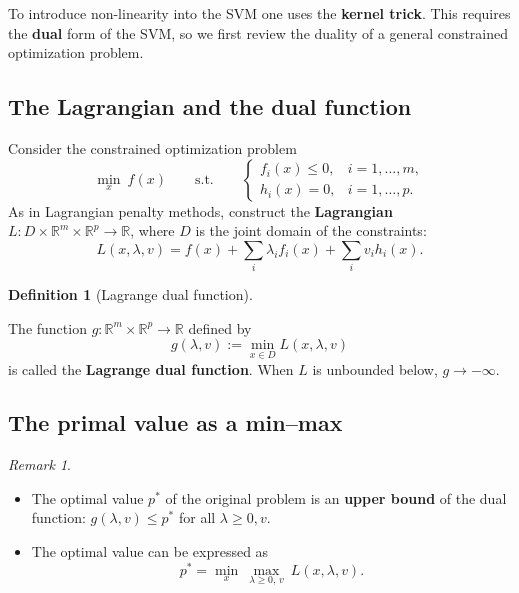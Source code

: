 \documentclass[
  letterpaper,
  DIV=11,
  numbers=noendperiod]{scrreprt}
\providecommand{\tightlist}{%
  \setlength{\itemsep}{0pt}\setlength{\parskip}{0pt}}
\theoremstyle{definition}
\newtheorem{definition}{Definition}[chapter]
\theoremstyle{plain}
\theoremstyle{plain}
\theoremstyle{definition}
\theoremstyle{plain}
\theoremstyle{plain}
\theoremstyle{remark}
\newtheorem*{remark}{Remark}
\begin{document}
To introduce non-linearity into the SVM one uses the \textbf{kernel
trick}. This requires the \textbf{dual} form of the SVM, so we first
review the duality of a general constrained optimization problem.

\subsection{The Lagrangian and the dual
function}\label{the-lagrangian-and-the-dual-function}

Consider the constrained optimization problem \[
\min_x \ f(x)
\qquad\text{s.t.}\qquad
\begin{cases}
f_i(x) \le 0, & i = 1, \dots, m, \\
h_i(x) = 0, & i = 1, \dots, p .
\end{cases}
\] As in Lagrangian penalty methods, construct the \textbf{Lagrangian}
\(L : D \times \mathbb{R}^m \times \mathbb{R}^p \to \mathbb{R}\), where
\(D\) is the joint domain of the constraints: \[
L(x, \lambda, v) = f(x) + \sum_{i} \lambda_i f_i(x) + \sum_i v_i h_i(x) .
\]

\begin{definition}[Lagrange dual
function]\protect\hypertarget{def-dual-function}{}\label{def-dual-function}

The function \(g : \mathbb{R}^m \times \mathbb{R}^p \to \mathbb{R}\)
defined by \[
g(\lambda, v) := \min_{x \in D} L(x, \lambda, v)
\] is called the \textbf{Lagrange dual function}. When \(L\) is
unbounded below, \(g \to -\infty\).

\end{definition}

\subsection{The primal value as a
min--max}\label{the-primal-value-as-a-minmax}

\begin{remark}
\leavevmode

\begin{itemize}
\tightlist
\item
  The optimal value \(p^\ast\) of the original problem is an
  \textbf{upper bound} of the dual function:
  \(g(\lambda, v) \le p^\ast\) for all \(\lambda \ge 0, v\).
\item
  The optimal value can be expressed as \[
  p^\ast = \min_x \ \max_{\lambda \ge 0,\, v} \ L(x, \lambda, v).
  \]
\end{itemize}

\end{remark}
\end{document}

